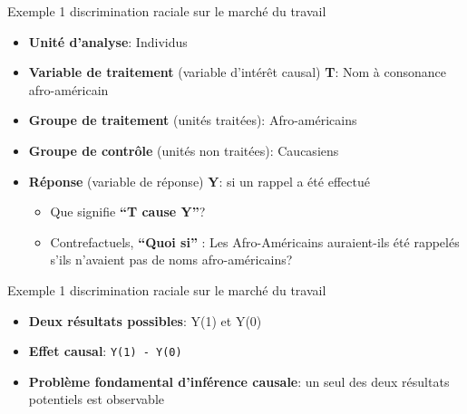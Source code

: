 \documentclass[ignorenonframetext,]{beamer}
\providecommand{\tightlist}{%
  \setlength{\itemsep}{0pt}\setlength{\parskip}{0pt}}
\begin{document}
\begin{frame}{Exemple 1 discrimination raciale sur le marché du travail}
\protect\hypertarget{exemple-1-discrimination-raciale-sur-le-marche-du-travail-1}{}

\begin{itemize}
\item
  \textbf{Unité d'analyse}: Individus
\item
  \textbf{Variable de traitement} (variable d'intérêt causal)
  \textbf{T}: Nom à consonance afro-américain
\item
  \textbf{Groupe de traitement} (unités traitées): Afro-américains
\item
  \textbf{Groupe de contrôle} (unités non traitées): Caucasiens
\item
  \textbf{Réponse} (variable de réponse) \textbf{Y}: si un rappel a été
  effectué

  \begin{itemize}
  \tightlist
  \item
    Que signifie \textbf{``T cause Y''}?
  \item
    Contrefactuels, \textbf{``Quoi si''} : Les Afro-Américains
    auraient-ils été rappelés s'ils n'avaient pas de noms
    afro-américains?
  \end{itemize}
\end{itemize}

\end{frame}

\begin{frame}[fragile]{Exemple 1 discrimination raciale sur le marché du
travail}
\protect\hypertarget{exemple-1-discrimination-raciale-sur-le-marche-du-travail-2}{}

\begin{itemize}
\item
  \textbf{Deux résultats possibles}: Y(1) et Y(0)
\item
  \textbf{Effet causal}: \texttt{Y(1)\ -\ Y(0)}
\item
  \textbf{Problème fondamental d'inférence causale}: un seul des deux
  résultats potentiels est observable
\end{itemize}

\end{frame}
\end{document}
